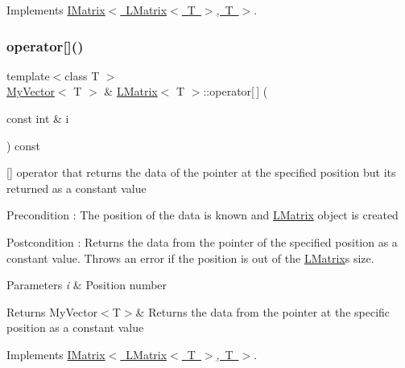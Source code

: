 Implements \mbox{\hyperlink{class_i_matrix}{I\+Matrix$<$ L\+Matrix$<$ T $>$, T $>$}}.

\mbox{\label{class_l_matrix_a56ec5ba9be0bb900ddc0ee7c5283bccd}} 
\subsubsection{\texorpdfstring{operator[]()}{operator[]()}\hspace{0.1cm}{\footnotesize\ttfamily [2/2]}}
{\footnotesize\ttfamily template$<$class T $>$ \\
\mbox{\hyperlink{class_my_vector}{My\+Vector}}$<$ T $>$ \& \mbox{\hyperlink{class_l_matrix}{L\+Matrix}}$<$ T $>$\+::operator\mbox{[}$\,$\mbox{]} (\begin{DoxyParamCaption}\item[{const int \&}]{i }\end{DoxyParamCaption}) const\hspace{0.3cm}{\ttfamily [virtual]}}



\mbox{[}\mbox{]} operator that returns the data of the pointer at the specified position but its returned as a constant value 

\begin{DoxyPrecond}{Precondition}
\+: The position of the data is known and \mbox{\hyperlink{class_l_matrix}{L\+Matrix}} object is created 
\end{DoxyPrecond}
\begin{DoxyPostcond}{Postcondition}
\+: Returns the data from the pointer of the specified position as a constant value. Throws an error if the position is out of the \mbox{\hyperlink{class_l_matrix}{L\+Matrix}}\textquotesingle{}s size. 
\end{DoxyPostcond}

\begin{DoxyParams}{Parameters}
{\em i} & Position number \\
\hline
\end{DoxyParams}
\begin{DoxyReturn}{Returns}
My\+Vector$<$\+T$>$\& Returns the data from the pointer at the specific position as a constant value 
\end{DoxyReturn}


Implements \mbox{\hyperlink{class_i_matrix}{I\+Matrix$<$ L\+Matrix$<$ T $>$, T $>$}}.

